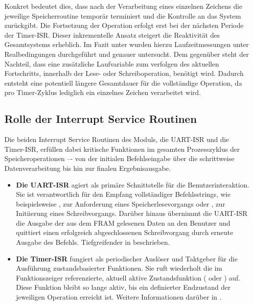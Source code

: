 \newpage
Konkret bedeutet dies, dass nach der Verarbeitung eines einzelnen Zeichens die jeweilige Speicherroutine tempor\"ar terminiert und die Kontrolle an das System zur\"uckgibt. Die Fortsetzung der Operation erfolgt erst bei der n\"achsten Periode der Timer-ISR. Dieser inkrementelle Ansatz steigert die Reaktivit\"at des Gesamtsystems erheblich. Im Fazit unter  wurden hierzu Laufzeitmessungen unter Realbedingungen durchgef\"uhrt und genauer untersucht. Dem gegen\"uber steht der Nachteil, dass eine zus\"atzliche Laufvariable zum verfolgen des aktuellen Fortschritts, innerhalb der Lese- oder Schreiboperation, ben\"otigt wird. Dadurch entsteht eine potentiell l\"angere Gesamtdauer f\"ur die vollst\"andige Operation, da pro Timer-Zyklus lediglich ein einzelnes Zeichen verarbeitet wird.\AI


\subsection{Rolle der Interrupt Service Routinen}
\label{sec:LesenSchreiben_Rolle_ISR}

Die beiden Interrupt Service Routinen des Moduls, die UART-ISR und die Timer-ISR, erf\"ullen dabei kritische Funktionen im gesamten Prozesszyklus der Speicheroperationen –- von der initialen Befehlseingabe \"uber die schrittweise Datenverarbeitung bis hin zur finalen Ergebnisausgabe.

\begin{itemize}
	\item \textbf{Die UART-ISR} agiert als prim\"are Schnittstelle f\"ur die Benutzerinteraktion. Sie ist verantwortlich f\"ur den Empfang vollst\"andiger Befehlsstrings, wie beispielsweise \glqq{}\grqq{}, zur Anforderung eines Speicherlesevorgangs oder \glqq{}\grqq{}, zur Initiierung eines Schreibvorgangs. Dar\"uber hinaus \"ubernimmt die UART-ISR die Ausgabe der aus dem FRAM gelesenen Daten an den Benutzer und quittiert einen erfolgreich abgeschlossenen Schreibvorgang durch erneute Ausgabe des Befehls. Tiefgreifender in  beschrieben.
	
	\item \textbf{Die Timer-ISR} fungiert als periodischer Ausl\"oser und Taktgeber f\"ur die Ausf\"uhrung zustandsbasierter Funktionen. Sie ruft wiederholt die im Funktionszeiger  referenzierte, aktuell aktive Zustandsfunktion (\zB {} oder ) auf. Diese Funktion bleibt so lange aktiv, bis ein definierter Endzustand der jeweiligen Operation erreicht ist. Weitere Informationen dar\"uber in .
\end{itemize}

